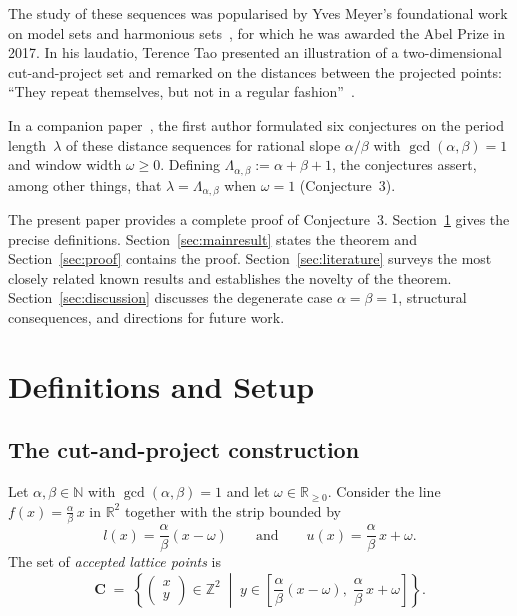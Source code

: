 \documentclass[11pt]{article}
\theoremstyle{plain}
\theoremstyle{definition}
\theoremstyle{remark}
\begin{document}
The study of these sequences was popularised by Yves Meyer's foundational work
on model sets and harmonious sets~\cite{Meyer1972}, for which he was awarded the
Abel Prize in 2017.  In his laudatio, Terence Tao presented an illustration of a
two-dimensional cut-and-project set and remarked on the distances between the
projected points: ``They repeat themselves, but not in a regular
fashion''~\cite{SpeechTao}.

In a companion paper~\cite{Kunert2025conjectures}, the first author formulated
six conjectures on the period length~$\lambda$ of these distance sequences for
rational slope $\alpha/\beta$ with $\gcd(\alpha,\beta)=1$ and window width
$\omega \ge 0$.  Defining $\Lambda_{\alpha,\beta} := \alpha + \beta + 1$,
the conjectures assert, among other things, that $\lambda = \Lambda_{\alpha,\beta}$
when $\omega = 1$ (Conjecture~3).

The present paper provides a complete proof of Conjecture~3.
Section~\ref{sec:setup} gives the precise definitions.
Section~\ref{sec:mainresult} states the theorem and Section~\ref{sec:proof}
contains the proof.
Section~\ref{sec:literature} surveys the most closely related known results
and establishes the novelty of the theorem.
Section~\ref{sec:discussion} discusses the degenerate case $\alpha = \beta = 1$,
structural consequences, and directions for future work.

\section{Definitions and Setup}\label{sec:setup}

\subsection{The cut-and-project construction}\label{subsec:construction}

Let $\alpha, \beta \in \mathbb{N}$ with $\gcd(\alpha, \beta) = 1$ and let
$\omega \in \mathbb{R}_{\ge 0}$.
Consider the line $f(x) = \frac{\alpha}{\beta}\,x$ in $\mathbb{R}^2$ together
with the strip bounded by
\[
    l(x) = \frac{\alpha}{\beta}(x - \omega)
    \qquad\text{and}\qquad
    u(x) = \frac{\alpha}{\beta}\,x + \omega.
\]
The set of \emph{accepted lattice points} is
\begin{equation}\label{eq:points}
    \mathbf{C} \;=\; \left\{
    \begin{pmatrix} x \\ y \end{pmatrix} \in \mathbb{Z}^2
    \;\middle|\;
    y \in
    \left[\frac{\alpha}{\beta}(x - \omega),\;
          \frac{\alpha}{\beta}\,x + \omega\right]
    \right\}.
\end{equation}
\end{document}
